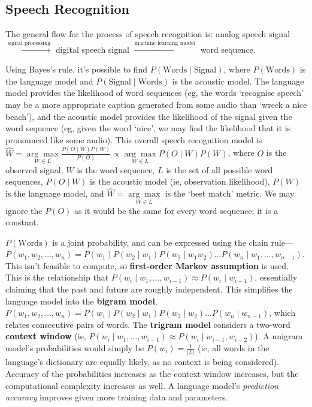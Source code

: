 
\subsection{Speech Recognition}\label{sub_sec:speech_recognition}

The general flow for the process of speech recognition is: analog speech signal $\overset{\text{signal processing}}{\rightarrow}$ digital speech signal $\overset{\text{machine learning model}}{\rightarrow}$ word sequence.

Using Bayes's rule, it's possible to find $P(\text{Words} \mid \text{Signal})$, where $P(\text{Words})$ is the language model and $P(\text{Signal} \mid \text{Words})$ is the acoustic model. The language model provides the likelihood of word sequences (eg, the words `recognise speech' may be a more appropriate caption generated from some audio than `wreck a nice beach'), and the acoustic model provides the likelihood of the signal given the word sequence (eg, given the word `nice', we may find the likelihood that it is pronounced like some audio). This overall speech recognition model is $\hat{W} = \underset{W \in L}{\arg \max} \frac{P(O \mid W)P(W)}{P(O)} \propto \underset{W \in L}{\arg \max} P(O \mid W)P(W)$, where $O$ is the observed signal, $W$ is the word sequence, $L$ is the set of all possible word sequences, $P(O \mid W)$ is the acoustic model (ie, observation likelihood), $P(W)$ is the language model, and $\hat{W} = \underset{W \in L}{\arg \max}$ is the `best match' metric. We may ignore the $P(O)$ as it would be the same for every word sequence; it is a constant.

$P(\text{Words})$ is a joint probability, and can be expressed using the chain rule---$P(w_{1}, w_{2}, \ldots, w_{n}) = P(w_{1})P(w_{2} \mid w_{1}) P(w_{3} \mid w_{1}w_{2}) \ldots P(w_{n} \mid w_{1}, \ldots, w_{n-1})$. This isn't feasible to compute, so \textbf{first-order Markov assumption} is used. This is the relationship that $P(w_{i} \mid w_{1}, \ldots, w_{i-1}) \approx P(w_{i} \mid w_{i-1})$, essentially claiming that the past and future are roughly independent. This simplifies the language model into the \textbf{bigram model}, $P(w_{1}, w_{2}, \ldots, w_{n}) = P(w_{1})P(w_{2} \mid w_{1}) P(w_{3} \mid w_{2}) \ldots P(w_{n} \mid w_{n-1})$, which relates consecutive pairs of words. The \textbf{trigram model} considers a two-word \textbf{context window} (ie, $P(w_{i} \mid w_{1}, \ldots, w_{i-1}) \approx P(w_{i} \mid w_{i-1}, w_{i-2})$). A unigram model's probabilities would simply be $P(w_{i}) = \frac{1}{|L|}$ (ie, all words in the language's dictionary are equally likely, as no context is being considered). Accuracy of the probabilities increases as the context window increases, but the computational complexity increases as well. A language model's \emph{prediction accuracy} improves given more training data and parameters.

